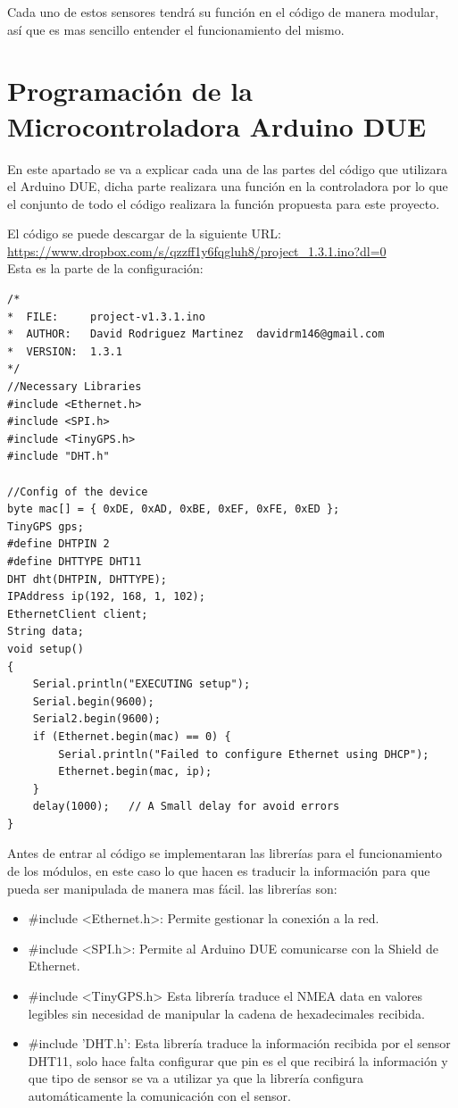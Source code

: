 Cada uno de estos sensores tendrá su función en el código de manera modular, así que es mas sencillo entender el funcionamiento del mismo.

\section{Programación de la Microcontroladora Arduino DUE}

\setlength{\parindent}{5ex}En este apartado se va a explicar cada una de las partes del código que utilizara el Arduino DUE, dicha parte realizara una función en la controladora por lo que el conjunto de todo el código realizara la función propuesta para este proyecto.
\setlength{\parindent}{0ex}

El código se puede descargar de la siguiente URL: \url{https://www.dropbox.com/s/qzzff1y6fqgluh8/project_1.3.1.ino?dl=0}\\

Esta es la parte de la configuración:

\begin{lstlisting}
/*
*  FILE:     project-v1.3.1.ino
*  AUTHOR:   David Rodriguez Martinez  davidrm146@gmail.com
*  VERSION:  1.3.1
*/
//Necessary Libraries
#include <Ethernet.h>
#include <SPI.h>
#include <TinyGPS.h>
#include "DHT.h"

//Config of the device
byte mac[] = { 0xDE, 0xAD, 0xBE, 0xEF, 0xFE, 0xED };
TinyGPS gps;
#define DHTPIN 2  
#define DHTTYPE DHT11  
DHT dht(DHTPIN, DHTTYPE);
IPAddress ip(192, 168, 1, 102);
EthernetClient client;
String data;
void setup()
{  
	Serial.println("EXECUTING setup");
	Serial.begin(9600);
	Serial2.begin(9600);
	if (Ethernet.begin(mac) == 0) {
		Serial.println("Failed to configure Ethernet using DHCP");
		Ethernet.begin(mac, ip);
	}
	delay(1000);   // A Small delay for avoid errors
}
\end{lstlisting}

Antes de entrar al código se implementaran las librerías para el funcionamiento de los módulos, en este caso lo que hacen es traducir la información para que pueda ser manipulada de manera mas fácil. las librerías son:

\begin{itemize}
	\item \#include <Ethernet.h>: Permite gestionar la conexión a la red.
	\item \#include <SPI.h>: Permite al Arduino DUE comunicarse con la Shield de Ethernet.
	\item \#include <TinyGPS.h> Esta librería traduce el NMEA data en valores legibles sin necesidad de manipular la cadena de hexadecimales recibida.
	\item \#include 'DHT.h':  Esta librería traduce la información recibida por el sensor DHT11, solo hace falta configurar que pin es el que recibirá la información y que tipo de sensor se va a utilizar ya que la librería configura automáticamente la comunicación con el sensor.
\end{itemize}


